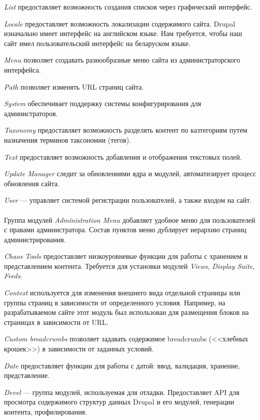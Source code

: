 \textit{List} предоставляет возможность создания списков через графический интерфейс.

\textit{Locale} предоставляет возможность локализации содержимого сайта.
Drupal изначально имеет интерфейс на английском языке. 
Нам требуется, чтобы наш сайт имел пользовательский интерфейс на беларуском языке.

\textit{Menu} позволяет создавать разнообразные меню сайта из администраторского интерфейса.

\textit{Path} позволяет изменять URL страниц сайта.

\textit{System} обеспечивает поддержку системы конфигурирования
для администраторов.

\textit{Taxonomy} предоставляет возможность разделять контент по казтегориям 
путем назначения терминов таксономии (тегов).

\textit{Text} предоставляет возможность добавления и отображения текстовых полей.

\textit{Update Manager} следит за обновлениями ядра и модулей,
автоматизирует процесс обновления сайта.

\textit{User} --- управляет системой регистрации пользователей, а также входом на сайт.

\paragraph{}
Группа модулей \textit{Administration Menu} добавляет удобное меню для
пользователей с правами администратора.
Состав пунктов меню дублирует иерархию страниц администрирования.

\textit{Chaos Tools} предоставляет низкоуровневые функции для работы с хранением и 
представлением контента. Требуется для установки модулей \textit{Views},
\textit{Display Suite}, \textit{Feeds}.

\textit{Context} используется для изменения внешнего вида отдельной страницы или 
группы страниц в зависимости от определенного условия.
Например, на разрабатываемом сайте этот модуль был использован для размещения блоков
на страницах в зависимости от URL.
  
\textit{Custom breadcrumbs} позволяет задавать содержимое breadcrumbs (<<хлебных крошек>>) 
в зависимости от заданных условий.

\textit{Date} предоставляет функции для работы с датой:
ввод, валидация, хранение, представление.

\textit{Devel} --- группа модулей, используемая для отладки.
Предоставляет API для просмотра содержимого структур данных Drupal и его модулей,
генерации контента, профилирования.

